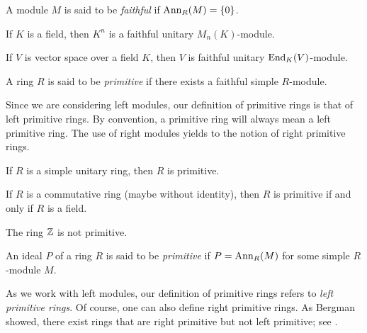 
\begin{definition}
A module $M$ is said to be \emph{faithful} if $\operatorname{Ann}_R(M)=\{0\}$. 
\end{definition}

\begin{example}
	If $K$ is a field, then $K^n$ is a faithful unitary $M_n(K)$-module.
\end{example}

\begin{example}
	If $V$ is vector space over a field $K$, then $V$ is faithful unitary $\operatorname{End}_K(V)$-module.
\end{example}

\begin{definition}
A ring $R$ is said to be \emph{primitive} if there exists a faithful simple $R$-module.  
\end{definition}

Since 
we are considering left modules, our definition of primitive rings is that of left primitive rings.
By convention, a primitive ring
will always mean a left primitive ring. 
The use 
of right modules yields to the notion of right primitive rings.  

\begin{exercise}
	\label{xca:simple=>prim}
	If $R$ is a simple unitary ring, then $R$ is primitive. 
\end{exercise}

\begin{exercise}
	\label{xca:prim+conm=cuerpo}
	If $R$ is a commutative ring (maybe without identity), then $R$ is primitive if and only if $R$ is a field. 
\end{exercise}

\begin{example}
	The ring $\mathbb{Z}$ is not primitive. 
\end{example}

\begin{definition}
An ideal $P$ of a ring $R$ is said to be \emph{primitive} if $P=\operatorname{Ann}_R(M)$
for some simple $R$-module $M$. 
\end{definition}

As we work with left modules, our definition of primitive rings refers to \emph{left primitive rings}. Of course, one can also define right primitive rings. As Bergman showed, there exist rings that are right primitive but not left primitive; see \cite{MR175940,MR167497}. 

